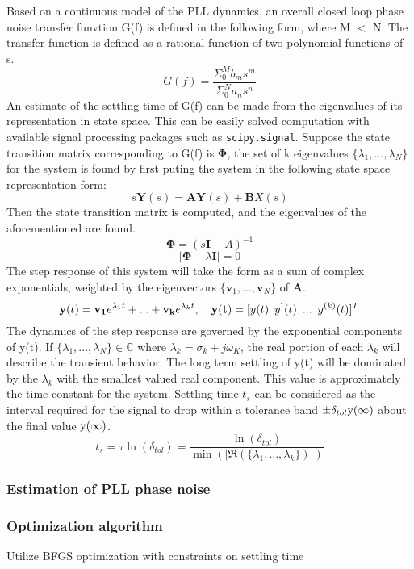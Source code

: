 	Based on a continuous model of the PLL dynamics, an overall closed loop phase noise transfer funvtion G(f) is defined in the following form, where M $<$ N. The transfer function is defined as a rational function of two polynomial functions of s. 
	\begin{equation}
	G(f) = \frac{\Sigma_0^M b_ms^m}{\Sigma_0^N a_ns^n}
	\end{equation}
	An estimate of the settling time of G(f) can be made from the eigenvalues of its  representation in state space. This can be easily solved computation with available signal processing packages such as \texttt{scipy.signal}. Suppose the state transition matrix corresponding to G(f) is $\mathbf{\Phi}$, the set of k eigenvalues $\{\lambda_1, ... , \lambda_{N}\}$ for the system is found by first puting the system in the following state space representation form:
	\begin{equation}
	s\mathbf{Y}(s) = \mathbf{AY}(s) +\mathbf{B}X(s)
	\end{equation}
	Then the state transition matrix is computed, and the eigenvalues of the aforementioned are found.
	\begin{equation}
	\mathbf{\Phi} = (s\mathbf{I}-A)^{-1}
	\end{equation}
	\begin{equation}
	|\mathbf{\Phi} - \lambda \mathbf{I}| = 0
	\end{equation}
	The step response of this system will take the form as a sum of complex exponentials, weighted by the eigenvectors $\{\mathbf{v}_1, ... , \mathbf{v}_N\}$ of $\mathbf{A}$.
	\begin{equation}
	\mathbf{y}(t) = \mathbf{v_1}e^{\lambda_1t} + ... + \mathbf{v_k}e^{\lambda_kt}, \hspace{1em} \mathbf{y(t)} = [ y(t) \hspace{0.5em}y^{'}(t)\hspace{0.5em} ...\hspace{0.5em} y^{(k)}(t)]^T
	\end{equation}
	The dynamics of the step response are governed by the exponential components of y(t). If  $\{\lambda_1, ... , \lambda_N\} \in \mathds{C}$ where $\lambda_k=\sigma_k+j\omega_K$, the real portion of each $\lambda_k$ will describe the transient behavior. The long term settling of y(t) will be dominated by the $\lambda_k$ with the smallest valued real component. This value is approximately the time constant for the system. Settling time $t_s$ can be considered as the interval required for the signal to drop within a tolerance band $\pm \delta_{tol} \textnormal{y}(\infty)$ about the final value $\textnormal{y}(\infty)$. 
	\begin{equation}
	t_s = \tau\ln(\delta_{tol}) = \frac{\ln(\delta_{tol})}{\min(|\Re(\{\lambda_1, ... , \lambda_k\})|)}
	\end{equation}
\subsubsection{Estimation of PLL phase noise}
\subsubsection{Optimization algorithm}
Utilize BFGS optimization with constraints on settling time
